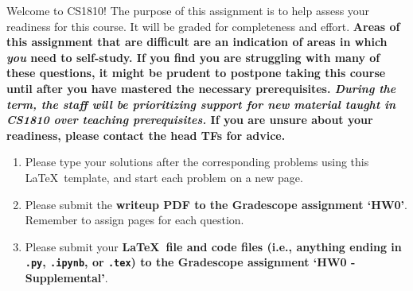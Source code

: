 \documentclass{harvardml}
\theoremstyle{definition}
\theoremstyle{plain}
\begin{document}
\noindent Welcome to CS1810! The purpose of this assignment is to help assess your readiness for this course.  It will be graded for completeness and effort.  \textbf{Areas of this assignment that are difficult are an indication of areas in which \emph{you} need to self-study. If you find you are struggling with many of these questions, it might be prudent to postpone taking this course until after you have mastered the necessary prerequisites.  \emph{During the term, the staff will be prioritizing support for new material taught in CS1810 over teaching prerequisites.}  If you are unsure about your readiness, please contact the head TFs for advice.}


\begin{enumerate}
    \item Please type your solutions after the corresponding problems using this \LaTeX\ template, and start each problem on a new page.
    \item Please submit the \textbf{writeup PDF to the Gradescope assignment `HW0'}. Remember to assign pages for each question.
    \item Please submit your \textbf{\LaTeX\ file and code files (i.e., anything ending in \texttt{.py}, \texttt{.ipynb}, or \texttt{.tex}) to the Gradescope assignment `HW0 - Supplemental'}. 
\end{enumerate}
\end{document}
